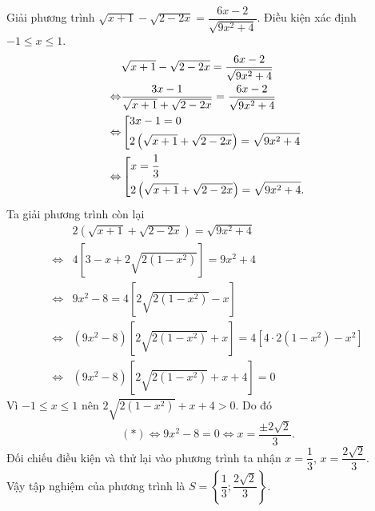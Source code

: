 \begin{bt}%
	Giải phương trình $\sqrt{x+1} - \sqrt{2 - 2x} = \dfrac{6x-2}{\sqrt{9x^2 + 4}}$.
	\loigiai
	{
		Điều kiện xác định $-1 \le x \le 1$.
		\begin{align*}
		& \sqrt{x+1}- \sqrt{2 - 2x} = \dfrac{6x - 2}{\sqrt{9x^2 + 4}} \\
		\Leftrightarrow & \dfrac{3x - 1}{\sqrt{x+1} + \sqrt{2 - 2x}} = \dfrac{6x  - 2}{\sqrt{9x^2 + 4}} \\
		\Leftrightarrow & \left[\begin{aligned}&3x - 1 = 0 \\&2\left(\sqrt{x+1}+\sqrt{2 - 2x}\right) = \sqrt{9x^2 + 4}\end{aligned}\right. \\
		\Leftrightarrow & \left[\begin{aligned}&x = \dfrac{1}{3}\\& 2\left(\sqrt{x+1}+\sqrt{2 - 2x}\right) = \sqrt{9x^2 + 4}.\end{aligned}\right.
		\end{align*}
		Ta giải phương trình còn lại
		\begin{align*}
		& 2\left(\sqrt{x+1}+\sqrt{2 - 2x}\right) = \sqrt{9x^2 + 4} \\
		\Leftrightarrow & 4\left[3 - x + 2\sqrt{2(1-x^2)}\right] = 9x^2 + 4 \\
		\Leftrightarrow & 9x^2 - 8 = 4 \left[2\sqrt{2(1-x^2)} - x\right] \\
		\Leftrightarrow & (9x^2 - 8)\left[2\sqrt{2(1 - x^2)} + x\right] = 4\left[4\cdot 2(1-x^2)-x^2\right] \\
		\Leftrightarrow & (9x^2  -8 )\left[2\sqrt{2(1-x^2)} + x + 4\right] = 0 \tag{*}
		\end{align*}
		Vì $-1 \le x \le 1$ nên $2\sqrt{2(1-x^2)} + x + 4 > 0$. Do đó
		$$(*) \Leftrightarrow 9x^2 - 8 = 0 \Leftrightarrow x = \dfrac{\pm 2\sqrt{2}}{3}.$$
		Đối chiếu điều kiện và thử lại vào phương trình ta nhận $x = \dfrac{1}{3}$, $x = \dfrac{2\sqrt{2}}{3}$. \\
		Vậy tập nghiệm của phương trình là $S = \left\{ \dfrac{1}{3}; \dfrac{2\sqrt{2}}{3}\right\}$.  
	}
\end{bt}



